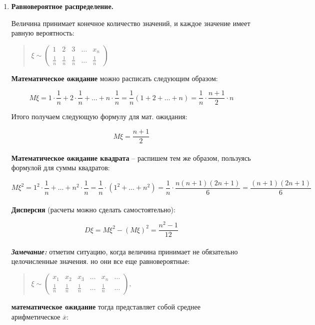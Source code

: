 \documentclass{article}
\begin{document}
\begin{enumerate}
\item \textbf{Равновероятное распределение.}

Величина принимает конечное количество значений, и каждое значение имеет равную вероятность:

\begin{quote}
$\xi \sim
\begin{pmatrix}
1 & 2 & 3 & \ldots & x_n\\
\frac{1}{n} & \frac{1}{n} & \frac{1}{n} & \ldots & \frac{1}{n}
\end{pmatrix}$
\end{quote}

\textbf{Математическое ожидание} можно расписать следующим образом:

$$M\xi = 1 \cdot \frac{1}{n} + 2 \cdot \frac{1}{n} + \ldots + n \cdot \frac{1}{n} =
\frac{1}{n} (1 + 2 + \ldots + n) = \frac{1}{n} \cdot \frac{n + 1}{2} \cdot n $$

Итого получаем следующую формулу для мат. ожидания:

$$\boxed{
M\xi = \frac{n + 1}{2}
}$$
\\

\textbf{Математическое ожидание квадрата} -- распишем тем же образом, пользуясь формулой для суммы квадратов:

$$M\xi^2 = 1^2 \cdot \frac{1}{n} + \ldots + n^2 \cdot \frac{1}{n} =
\frac{1}{n} \cdot (1^2 + \ldots + n^2) =
\frac{1}{n} \cdot \frac{n(n + 1)(2n + 1)}{6} = \frac{(n + 1)(2n + 1)}{6}$$
\\

\textbf{Дисперсия} (расчеты можно сделать самостоятельно):

$$\boxed{D\xi} = M\xi^2 - (M\xi)^2 = \boxed{\frac{n^2 - 1}{12}}$$ 
\\

\textbf{\textit{Замечание: }} отметим ситуацию, когда величина принимает не обязательно целочисленные значения. но они все еще равновероятные:

\begin{quote}
$\xi \sim
\begin{pmatrix}
x_1 & x_2 & x_3 & \ldots & x_n & \ldots\\
\frac{1}{n} & \frac{1}{n} & \frac{1}{n} & \ldots & \frac{1}{n} & \ldots
\end{pmatrix},$
\end{quote}

\textbf{математическое ожидание} тогда представляет собой среднее арифметическое $\overline{x}$:


\end{enumerate}
\end{document}
